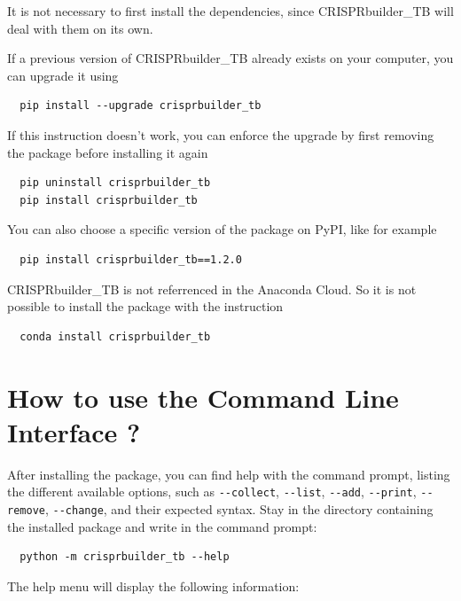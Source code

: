 \documentclass[twoside,a4paper,11pt,frenchb,openany]{report}
\begin{document}
 It is not necessary to first install the dependencies, since CRISPRbuilder\_TB will deal with them on its own.

If a previous version of CRISPRbuilder\_TB already exists on your computer, you can upgrade it using 

\begin{verbatim}
  pip install --upgrade crisprbuilder_tb
\end{verbatim}

If this instruction doesn't work, you can enforce the upgrade by first removing the package before installing it again

\begin{verbatim}
  pip uninstall crisprbuilder_tb
  pip install crisprbuilder_tb
\end{verbatim}

You can also choose a specific version of the package on PyPI, like for example

\begin{verbatim}
  pip install crisprbuilder_tb==1.2.0
\end{verbatim}

CRISPRbuilder\_TB is not referrenced in the Anaconda Cloud. So it is not possible to install the package with the instruction

\begin{verbatim}
  conda install crisprbuilder_tb
\end{verbatim}


    \section{How to use the Command Line Interface
?}\label{how-to-use-the-command-line-interface}

    After installing the package, you can find help with the command prompt,
listing the different available options, such as \texttt{-\/-collect},
\texttt{-\/-list}, \texttt{-\/-add}, \texttt{-\/-print},
\texttt{-\/-remove}, \texttt{-\/-change}, and their expected syntax.
Stay in the directory containing the installed package and write in the
command prompt:

    \begin{verbatim}
  python -m crisprbuilder_tb --help
\end{verbatim}

    The help menu will display the following information:
\end{document}
